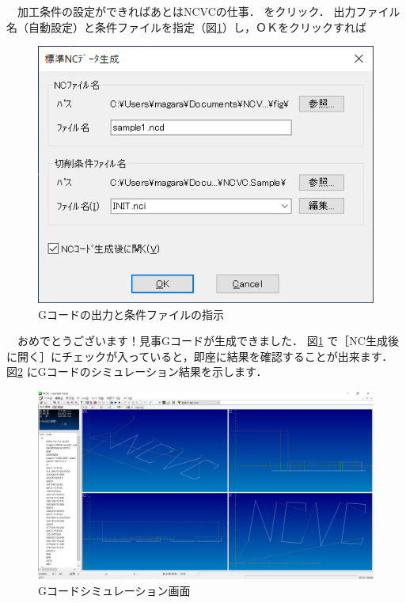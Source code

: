 \begin{minipage}[t]{0.5\textwidth}
　加工条件の設定ができればあとはNCVCの仕事．
 をクリック．
出力ファイル名（自動設定）と条件ファイルを指定（図\ref{fig:make.png}）し，ＯＫをクリックすれば
\end{minipage}
\begin{minipage}[t]{0.5\textwidth}
\vspace*{-2zh}
\begin{figure}[H]
\centering
\includegraphics[scale=0.7]{No1/fig/make.png}
\caption{Gコードの出力と条件ファイルの指示}
\label{fig:make.png}
\end{figure}
\end{minipage}

\vspace*{2zh}
　おめでとうございます！見事Gコードが生成できました．
図\ref{fig:make.png} で［NC生成後に開く］にチェックが入っていると，即座に結果を確認することが出来ます．
図\ref{fig:sim.png} にGコードのシミュレーション結果を示します．

\begin{figure}[H]
\centering
\includegraphics[scale=0.4]{No1/fig/sim.png}
\caption{Gコードシミュレーション画面}
\label{fig:sim.png}
\end{figure}

